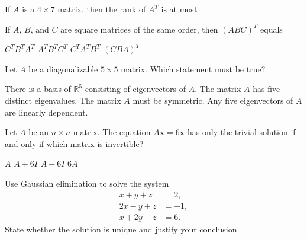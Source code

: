 \documentclass[12pt,a4paper,answers,addpoints]{exam}
\begin{document}
\begin{questions}
\vspace{2mm}

\question[2]
If $A$ is a $4\times7$ matrix, then the rank of $A^T$ is at most
\begin{choices}
\end{choices}

\vspace{2mm}

\question[2]
If $A$, $B$, and $C$ are square matrices of the same order, then $(ABC)^T$ equals
\begin{choices}
    \choice $C^TB^TA^T$
    \choice $A^TB^TC^T$
    \choice $C^TA^TB^T$
    \choice $(CBA)^T$
\end{choices}

\vspace{2mm}

\question[2]
Let $A$ be a diagonalizable $5\times5$ matrix. Which statement must be true?
\begin{choices}
    \choice There is a basis of $\mathbb R^5$ consisting of eigenvectors of $A$.
    \choice The matrix $A$ has five distinct eigenvalues.
    \choice The matrix $A$ must be symmetric.
    \choice Any five eigenvectors of $A$ are linearly dependent.
\end{choices}

\vspace{2mm}

\question[2]
Let $A$ be an $n\times n$ matrix. The equation $A\mathbf x=6\mathbf x$ has only
the trivial solution if and only if which matrix is invertible?
\begin{choices}
    \choice $A$
    \choice $A+6I$
    \choice $A-6I$
    \choice $6A$
\end{choices}

\endgroup

\vspace{0.3cm}

\newpage
{}
\vspace{0.4cm}

\question[12]
Use Gaussian elimination to solve the system
\[
\begin{aligned}
x+y+z&=2,\\
2x-y+z&=-1,\\
x+2y-z&=6.
\end{aligned}
\]
State whether the solution is unique and justify your conclusion.


\end{questions}
\end{document}
